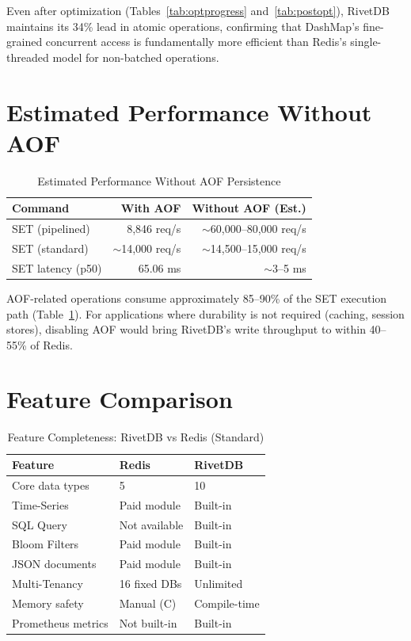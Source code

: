 \documentclass[12pt,a4paper]{report}
\begin{document}
Even after optimization (Tables~\ref{tab:optprogress} and~\ref{tab:postopt}), RivetDB maintains its 34\% lead in atomic operations, confirming that DashMap's fine-grained concurrent access is fundamentally more efficient than Redis's single-threaded model for non-batched operations.

\section{Estimated Performance Without AOF}

\begin{table}[htbp]
\caption{Estimated Performance Without AOF Persistence}
\label{tab:noaof}
\centering
\begin{tabular}{@{}lrr@{}}
\toprule
\textbf{Command} & \textbf{With AOF} & \textbf{Without AOF (Est.)} \\
\midrule
SET (pipelined) & 8,846 req/s & $\sim$60,000--80,000 req/s \\
SET (standard) & $\sim$14,000 req/s & $\sim$14,500--15,000 req/s \\
SET latency (p50) & 65.06 ms & $\sim$3--5 ms \\
\bottomrule
\end{tabular}
\end{table}

AOF-related operations consume approximately 85--90\% of the SET execution path (Table~\ref{tab:noaof}). For applications where durability is not required (caching, session stores), disabling AOF would bring RivetDB's write throughput to within 40--55\% of Redis.

\section{Feature Comparison}

\begin{table}[htbp]
\caption{Feature Completeness: RivetDB vs Redis (Standard)}
\label{tab:features}
\centering
\begin{tabular}{@{}lll@{}}
\toprule
\textbf{Feature} & \textbf{Redis} & \textbf{RivetDB} \\
\midrule
Core data types & 5 & 10 \\
Time-Series & Paid module & Built-in \\
SQL Query & Not available & Built-in \\
Bloom Filters & Paid module & Built-in \\
JSON documents & Paid module & Built-in \\
Multi-Tenancy & 16 fixed DBs & Unlimited \\
Memory safety & Manual (C) & Compile-time \\
Prometheus metrics & Not built-in & Built-in \\
\bottomrule
\end{tabular}
\end{table}
\end{document}
